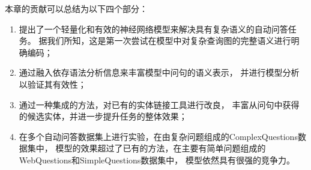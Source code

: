 





本章的贡献可以总结为以下四个部分：
\begin{enumerate}
\item{提出了一个轻量化和有效的神经网络模型来解决具有复杂语义的自动问答任务。
据我们所知，这是第一次尝试在模型中对复杂查询图的完整语义进行明确编码；}
\item{通过融入依存语法分析信息来丰富模型中问句的语义表示，
并进行模型分析以验证其有效性；}
\item{通过一种集成的方法，对已有的实体链接工具进行改良，
丰富从问句中获得的候选实体，并进一步提升任务的整体效果；}
\item{在多个自动问答数据集上进行实验，在由复杂问题组成的ComplexQuestions数据集中，
模型的效果超过了已有的方法，在主要有简单问题组成的WebQuestions和SimpleQuestions数据集中，
模型依然具有很强的竞争力。}
\end{enumerate}


